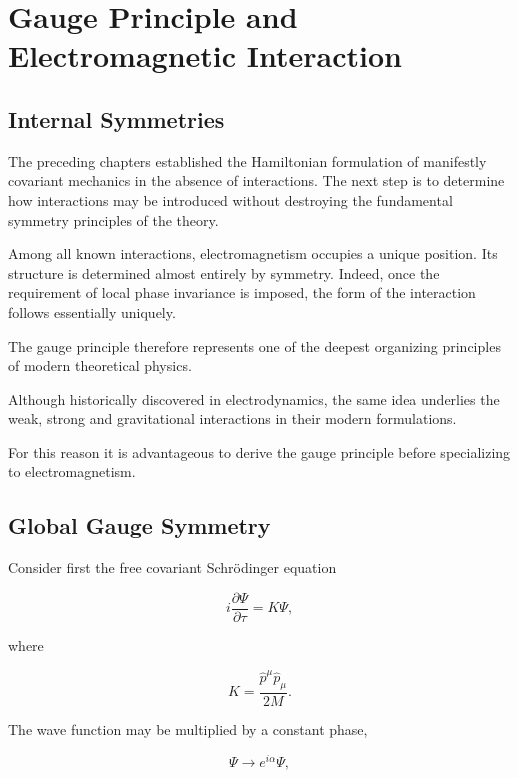 \chapter{Gauge Principle and Electromagnetic Interaction}

\section{Internal Symmetries}

The preceding chapters established the Hamiltonian formulation of
manifestly covariant mechanics in the absence of interactions.
The next step is to determine how interactions may be introduced
without destroying the fundamental symmetry principles of the theory.

Among all known interactions, electromagnetism occupies a unique
position. Its structure is determined almost entirely by symmetry.
Indeed, once the requirement of local phase invariance is imposed,
the form of the interaction follows essentially uniquely.

The gauge principle therefore represents one of the deepest organizing
principles of modern theoretical physics.

Although historically discovered in electrodynamics, the same idea
underlies the weak, strong and gravitational interactions in their
modern formulations.

For this reason it is advantageous to derive the gauge principle before
specializing to electromagnetism.


\section{Global Gauge Symmetry}

Consider first the free covariant Schrödinger equation

\[
i\frac{\partial\Psi}{\partial\tau}
=
K\Psi,
\]

where

\[
K
=
\frac{\hat p^\mu\hat p_\mu}{2M}.
\]

The wave function may be multiplied by a constant phase,

\[
\boxed{
\Psi
\rightarrow
e^{i\alpha}
\Psi,
}
\]

